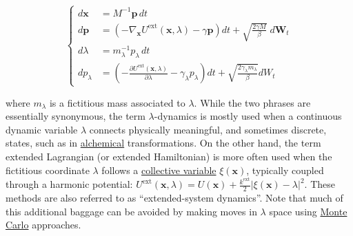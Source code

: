 \documentclass[9pt,review]{livecoms}
\newcommand{\vx}{\mathbf{x}}
\newcommand{\vp}{\mathbf{p}}
\begin{document}
\begin{equation}
\left\{
\begin{array}{ll}
d\vx &= M^{-1} \vp \, dt\\
d\vp &= \left(-\nabla_\vx U^\text{ext}(\vx,  \lambda) - \gamma \vp \right) dt
    + \sqrt{ \frac{2 \gamma M}{\beta}} \; d\mathbf{W}_t\\
d\lambda &= m_\lambda^{-1} p_\lambda \, dt \\
dp_\lambda &= \left(-\frac{\partial U^\text{ext}(\vx, \lambda)}{\partial \lambda} - \gamma_\lambda p_\lambda \right) dt
    + \sqrt{ \frac{2 \gamma_\lambda m_\lambda}{ \beta }} dW_t
\end{array}
\right.
\end{equation}

where $m_\lambda$ is a fictitious mass associated to $\lambda$.
While the two phrases are essentially synonymous, the term $\lambda$-dynamics is mostly used when a continuous dynamic variable $\lambda$ connects physically meaningful, and sometimes discrete, states, such as in \hyperlink{ref:Alchemical} {alchemical} transformations.
On the other hand, the term extended Lagrangian (or extended Hamiltonian) is more often used when the fictitious coordinate $\lambda$ follows a \hyperlink{ref:CV} {collective variable} $\xi(\vx)$, typically coupled through a harmonic potential: $U^\text{ext}(\vx, \lambda) = U(\vx) + \frac{k^\mathrm{ext}}{2}|\xi(\vx)-\lambda|^2$.
These methods are also referred to as ``extended-system dynamics''.  Note that much of this additional baggage can be avoided by making moves in $\lambda$ space using \hyperlink{ref:MetropolisMonteCarlo}{Monte Carlo} approaches.
\end{document}
